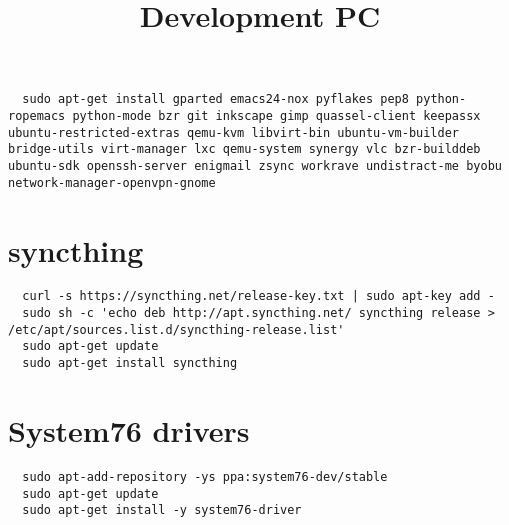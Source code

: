 \documentclass[12pt]{article}
\title{Development PC}
\begin{document}
\begin{verbatim}
  sudo apt-get install gparted emacs24-nox pyflakes pep8 python-ropemacs python-mode bzr git inkscape gimp quassel-client keepassx ubuntu-restricted-extras qemu-kvm libvirt-bin ubuntu-vm-builder bridge-utils virt-manager lxc qemu-system synergy vlc bzr-builddeb ubuntu-sdk openssh-server enigmail zsync workrave undistract-me byobu network-manager-openvpn-gnome
\end{verbatim}

\section{syncthing}

\begin{verbatim}
  curl -s https://syncthing.net/release-key.txt | sudo apt-key add -
  sudo sh -c 'echo deb http://apt.syncthing.net/ syncthing release > /etc/apt/sources.list.d/syncthing-release.list'
  sudo apt-get update
  sudo apt-get install syncthing
\end{verbatim}

\section{System76 drivers}

\begin{verbatim}
  sudo apt-add-repository -ys ppa:system76-dev/stable
  sudo apt-get update
  sudo apt-get install -y system76-driver
\end{verbatim}
\end{document}

